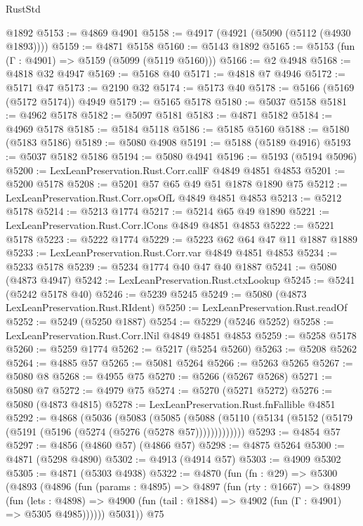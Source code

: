 \begin{lexlean}{RustStd}
\begin{coremodule}
{\begin{coremodule}
{{{{{{{{{{{{{{{{{{{{{{{{{{{{{    @1892
@5153 := @4869 @4901
@5158 := @4917 (@4921 (@5090 (@5112 (@4930 @1893))))
@5159 := @4871 @5158
@5160 := @5143 @1892
@5165 := @5153 (fun (Γ : @4901) => @5159 (@5099 (@5119 @5160)))
@5166 := @2 @4948
@5168 := @4818 @32 @4947
@5169 := @5168 @40
@5171 := @4818 @7 @4946
@5172 := @5171 @47
@5173 := @2190 @32
@5174 := @5173 @40
@5178 := @5166 (@5169 (@5172 @5174)) @4949
@5179 := @5165 @5178
@5180 := @5037 @5158
@5181 := @4962 @5178
@5182 := @5097 @5181
@5183 := @4871 @5182
@5184 := @4969 @5178
@5185 := @5184 @5118
@5186 := @5185 @5160
@5188 := @5180 (@5183 @5186)
@5189 := @5080 @4908
@5191 := @5188 (@5189 @4916)
@5193 := @5037 @5182 @5186
@5194 := @5080 @4941
@5196 := @5193 (@5194 @5096)
@5200 := LexLeanPreservation.Rust.Corr.callF @4849 @4851 @4853
@5201 := @5200 @5178
@5208 := @5201 @57 @65 @49 @51 @1878 @1890 @75
@5212 := LexLeanPreservation.Rust.Corr.opsOfL @4849 @4851 @4853
@5213 := @5212 @5178
@5214 := @5213 @1774
@5217 := @5214 @65 @49 @1890
@5221 := LexLeanPreservation.Rust.Corr.lCons @4849 @4851 @4853
@5222 := @5221 @5178
@5223 := @5222 @1774
@5229 := @5223 @62 @64 @47 @11 @1887 @1889
@5233 := LexLeanPreservation.Rust.Corr.var @4849 @4851 @4853
@5234 := @5233 @5178
@5239 := @5234 @1774 @40 @47 @40 @1887
@5241 := @5080 (@4873 @4947)
@5242 := LexLeanPreservation.Rust.ctxLookup
@5245 := @5241 (@5242 @5178 @40)
@5246 := @5239 @5245
@5249 := @5080 (@4873 LexLeanPreservation.Rust.RIdent)
@5250 := LexLeanPreservation.Rust.readOf
@5252 := @5249 (@5250 @1887)
@5254 := @5229 (@5246 @5252)
@5258 := LexLeanPreservation.Rust.Corr.lNil @4849 @4851 @4853
@5259 := @5258 @5178
@5260 := @5259 @1774
@5262 := @5217 (@5254 @5260)
@5263 := @5208 @5262
@5264 := @4885 @57
@5265 := @5081 @5264
@5266 := @5263 @5265
@5267 := @5080 @8
@5268 := @4955 @75
@5270 := @5266 (@5267 @5268)
@5271 := @5080 @7
@5272 := @4979 @75
@5274 := @5270 (@5271 @5272)
@5276 := @5080 (@4873 @4815)
@5278 := LexLeanPreservation.Rust.fnFallible @4851
@5292 := @4868
    (@5036
      (@5083
        (@5085
          (@5088 (@5110 (@5134 (@5152 (@5179 (@5191 (@5196 (@5274 (@5276 (@5278 @57)))))))))))))
@5293 := @4854 @57
@5297 := @4856 (@4860 @57) (@4866 @57)
@5298 := @4875 @5264
@5300 := @4871 (@5298 @4890)
@5302 := @4913 (@4914 @57)
@5303 := @4909 @5302
@5305 := @4871 (@5303 @4938)
@5322 := @4870
    (fun (fn : @29) =>
    @5300
      (@4893
        (@4896
          (fun (params : @4895) =>
          @4897
            (fun (rty : @1667) =>
            @4899
              (fun (lets : @4898) =>
              @4900 (fun (tail : @1884) => @4902 (fun (Γ : @4901) => @5305 @4985))))))
        @5031))
    @75
}}}}}}}}}}}}}}}}}}}}}}}}}}}}}
\end{coremodule}}
\end{coremodule}
\end{lexlean}

